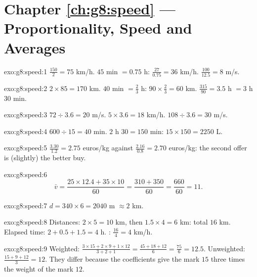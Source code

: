 \section*{Chapter \ref{ch:g8:speed} --- Proportionality, Speed and Averages}

\begin{solution}{exo:g8:speed:1}
$\frac{150}{2} = 75$ km/h. \quad
$45$ min $= 0.75$ h: $\frac{27}{0.75} = 36$ km/h. \quad
$\frac{100}{12.5} = 8$ m/s.
\end{solution}

\begin{solution}{exo:g8:speed:2}
$2 \times 85 = 170$ km. \quad
$40$ min $= \frac23$ h: $90 \times \frac23 = 60$ km. \quad
$\frac{315}{90} = 3.5$ h $= 3$ h $30$ min.
\end{solution}

\begin{solution}{exo:g8:speed:3}
$72 \div 3.6 = 20$ m/s. \quad
$5 \times 3.6 = 18$ km/h. \quad
$108 \div 3.6 = 30$ m/s.
\end{solution}

\begin{solution}{exo:g8:speed:4}
$600 \div 15 = 40$ min. \quad
$2$ h $30 = 150$ min: $15 \times 150 = 2250$ L.
\end{solution}

\begin{solution}{exo:g8:speed:5}
$\frac{3.30}{1.2} = 2.75$ euros/kg against
$\frac{2.16}{0.8} = 2.70$ euros/kg: the second offer is (slightly)
the better buy.
\end{solution}

\begin{solution}{exo:g8:speed:6}
\[
\bar v = \frac{25 \times 12.4 + 35 \times 10}{60}
= \frac{310 + 350}{60} = \frac{660}{60} = 11 .
\]
\end{solution}

\begin{solution}{exo:g8:speed:7}
$d = 340 \times 6 = 2040$ m $\approx 2$ km.
\end{solution}

\begin{solution}{exo:g8:speed:8}
Distances: $2 \times 5 = 10$ km, then $1.5 \times 4 = 6$ km: total
$16$ km. Elapsed time: $2 + 0.5 + 1.5 = 4$ h. :
$\frac{16}{4} = 4$ km/h.
\end{solution}

\begin{solution}{exo:g8:speed:9}
Weighted:
$\frac{3 \times 15 + 2 \times 9 + 1 \times 12}{3 + 2 + 1}
= \frac{45 + 18 + 12}{6} = \frac{75}{6} = 12.5$.
Unweighted: $\frac{15 + 9 + 12}{3} = 12$. They differ because the
coefficients give the mark $15$ three times the weight of the mark
$12$.
\end{solution}

